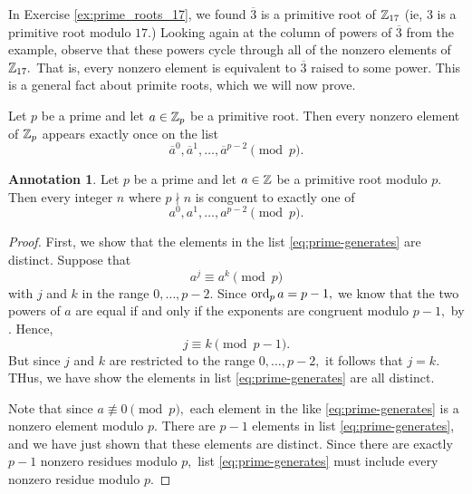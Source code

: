 \documentclass[letterpaper, 11 pt]{ximera}
\theoremstyle{definition}
\newtheorem*{annotation}{Annotation}
\begin{document}
In Exercise \ref{ex:prime_roots_17}, we found $\overline{3}$ is a primitive root of $\mathbb Z_{17}$ (ie, $3$ is a primitive root modulo $17.$) Looking again at the column of powers of $\overline{3}$ from the example, observe that these powers cycle through all of the nonzero elements of $\mathbb Z_{17}.$ That is, every nonzero element is equivalent to $\overline{3}$ raised to some power. This is a general fact about primite roots, which we will now prove.


\begin{prop*}[Proposition 10.3.2]\label{read-prop:prime-root-generates}
    Let $p$ be a prime and let $a\in\mathbb Z_p$ be a primitive root. Then every nonzero element of $\mathbb Z_p$ appears exactly once on the list \[\overline{a}^0,\overline{a}^1,\dots,\overline{a}^{p-2} \pmod{p}.\]
\end{prop*}

\begin{annotation}
    Let $p$ be a prime and let $a\in\mathbb Z$ be a primitive root modulo $p.$ Then every integer $n$ where $p\nmid n$ is conguent to exactly one of 
    \begin{equation}\label{eq:prime-generates}
        {a}^0,{a}^1,\dots,{a}^{p-2} \pmod{p}.
    \end{equation}
\end{annotation}

\begin{proof}
    First, we show that the elements in the list \eqref{eq:prime-generates} are distinct. Suppose that \[a^j\equiv a^k\pmod{p}\] 
    with $j$ and $k$ in the range $0,\dots,p-2.$ Since $\operatorname{ord}_p a=p-1,$ we know that the two powers of $a$ are equal if and only if the exponents are congruent modulo $p-1,$ by . Hence, \[j\equiv k\pmod{p-1}.\] 
    But since $j$ and $k$ are restricted to the range $0,\dots,p-2,$ it follows that $j=k.$ THus, we have show the elements in list \eqref{eq:prime-generates} are all distinct.

    Note that since $a\not\equiv 0\pmod{p},$ each element in the like \eqref{eq:prime-generates} is a nonzero element modulo $p.$ There are $p-1$ elements in list \eqref{eq:prime-generates}, and we have just shown that these elements are distinct. Since there are exactly $p-1$ nonzero residues modulo $p,$ list \eqref{eq:prime-generates} must include every nonzero residue modulo $p.$ 
\end{proof}
\end{document}

